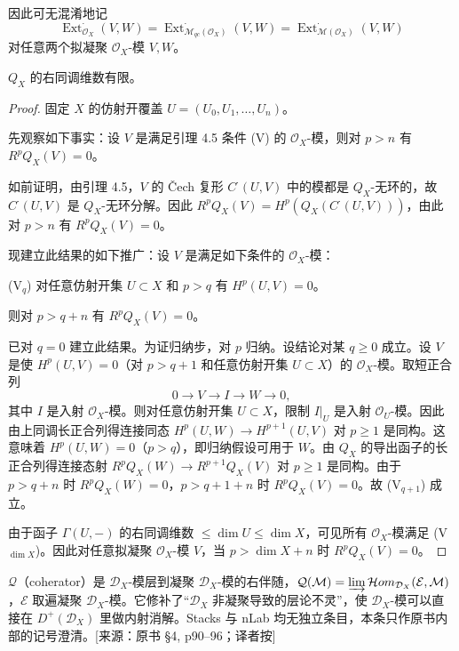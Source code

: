 因此可无混淆地记
$$\operatorname{Ext}^\cdot_{\mathcal{O}_X}(V,W)=\operatorname{Ext}^\cdot_{\mathcal{M}_{qc}(\mathcal{O}_X)}(V,W)=\operatorname{Ext}^\cdot_{\mathcal{M}(\mathcal{O}_X)}(V,W)$$
对任意两个拟凝聚 $\mathcal{O}_X$-模 $V,W$。

\begin{theorem}
$Q_X$ 的右同调维数有限。
\end{theorem}

\begin{proof}
固定 $X$ 的仿射开覆盖 $U=(U_0,U_1,\dots,U_n)$。

先观察如下事实：设 $V$ 是满足引理 4.5 条件 (V) 的 $\mathcal{O}_X$-模，则对 $p>n$ 有 $R^pQ_X(V)=0$。

如前证明，由引理 4.5，$V$ 的 Čech 复形 $C^\cdot(U,V)$ 中的模都是 $Q_X$-无环的，故 $C^\cdot(U,V)$ 是 $Q_X$-无环分解。因此 $R^pQ_X(V)=H^p(Q_X(C^\cdot(U,V)))$，由此对 $p>n$ 有 $R^pQ_X(V)=0$。

现建立此结果的如下推广：设 $V$ 是满足如下条件的 $\mathcal{O}_X$-模：

(V$_q$) 对任意仿射开集 $U\subset X$ 和 $p>q$ 有 $H^p(U,V)=0$。

则对 $p>q+n$ 有 $R^pQ_X(V)=0$。

已对 $q=0$ 建立此结果。为证归纳步，对 $p$ 归纳。设结论对某 $q\ge 0$ 成立。设 $V$ 是使 $H^p(U,V)=0$（对 $p>q+1$ 和任意仿射开集 $U\subset X$）的 $\mathcal{O}_X$-模。取短正合列
$$0\longrightarrow V\longrightarrow I\longrightarrow W\longrightarrow 0,$$
其中 $I$ 是入射 $\mathcal{O}_X$-模。则对任意仿射开集 $U\subset X$，限制 $I|_U$ 是入射 $\mathcal{O}_U$-模。因此由上同调长正合列得连接同态 $H^p(U,W)\to H^{p+1}(U,V)$ 对 $p\ge 1$ 是同构。这意味着 $H^p(U,W)=0$（$p>q$），即归纳假设可用于 $W$。由 $Q_X$ 的导出函子的长正合列得连接态射 $R^pQ_X(W)\to R^{p+1}Q_X(V)$ 对 $p\ge 1$ 是同构。由于 $p>q+n$ 时 $R^pQ_X(W)=0$，$p>q+1+n$ 时 $R^pQ_X(V)=0$。故 (V$_{q+1}$) 成立。

由于函子 $\Gamma(U,-)$ 的右同调维数 $\le\dim U\le\dim X$，可见所有 $\mathcal{O}_X$-模满足 (V$_{\dim X}$)。因此对任意拟凝聚 $\mathcal{O}_X$-模 $V$，当 $p>\dim X+n$ 时 $R^pQ_X(V)=0$。
\end{proof}
\begin{annote}
$\mathcal Q$（coherator）是 $\mathcal D_X$-模层到凝聚 $\mathcal D_X$-模的右伴随，$\mathcal Q(\mathcal M)=\varinjlim\mathcal H om_{\mathcal D_X}(\mathcal E,\mathcal M)$，$\mathcal E$ 取遍凝聚 $\mathcal D_X$-模。它修补了“$\mathcal D_X$ 非凝聚导致的层论不灵”，使 $\mathcal D_X$-模可以直接在 $D^+(\mathcal D_X)$ 里做内射消解。Stacks 与 nLab 均无独立条目，本条只作原书内部的记号澄清。[来源：原书 §4, p90–96；译者按]
\end{annote}



